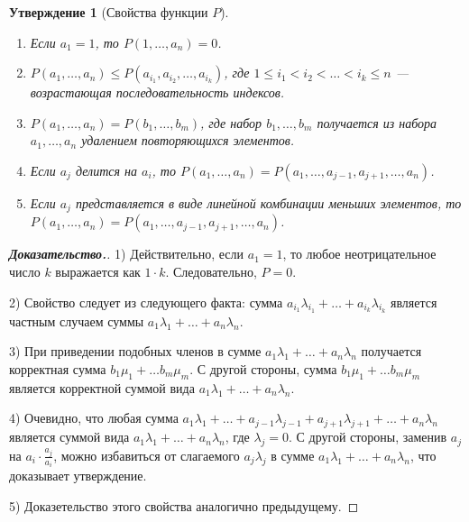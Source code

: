 \documentclass[12pt]{article}
\newtheorem{proposition}[theorem]{Утверждение}
\begin{document}
\begin{proposition}[Свойства функции $P$]{\ }
\label{propertiesOfP}
\begin{enumerate}
    \item Если $a_1 = 1$, то $P(1, \dots, a_n) = 0$.
    \item $P(a_1, \dots, a_n) \le P(a_{i_1} , a_{i_2}, \dots, a_{i_k})$, где $1 \le i_1 < i_2 < \dots < i_k \le n$ --- возрастающая последовательность индексов.
    \item $P(a_1, \dots, a_n) = P(b_1, \dots, b_m)$, где набор $b_1, \dots, b_m$ получается из набора $a_1, \dots, a_n$ удалением повторяющихся элементов.
    \item Если $a_j$ делится на $a_i$, то $P(a_1, \dots, a_n) = P(a_1, \dots, a_{j - 1}, a_{j + 1}, \dots, a_n)$.
    
    \item Если $a_j$ представляется в виде линейной комбинации меньших элементов, то \\
     $P(a_1, \dots, a_n) = P(a_1, \dots, a_{j - 1}, a_{j + 1}, \dots, a_n)$.
\end{enumerate}
\end{proposition}
\begin{proof}[\textbf{Доказательство.}]
1) Действительно, если $a_1 = 1$, то любое неотрицательное число $k$ выражается как $1 \cdot k$. Следовательно, $P = 0$.

2) Свойство следует из следующего факта: сумма $a_{i_1} \lambda_{i_1} + \dots + a_{i_k}\lambda_{i_k}$ является частным случаем суммы $a_1 \lambda_1 + \dots + a_n \lambda_n$.

3) При приведении подобных членов в сумме $a_1 \lambda_1 + \dots + a_n \lambda_n$ получается корректная сумма $b_1 \mu_1 + \dots b_m \mu_m$. С другой стороны, сумма $b_1 \mu_1 + \dots b_m \mu_m$ является корректной суммой вида $a_1 \lambda_1 + \dots + a_n \lambda_n$.

4) Очевидно, что любая сумма $a_1 \lambda_1 + \dots + a_{j - 1} \lambda_{j - 1} + a_{j + 1} \lambda_{j + 1} + \dots +a_n \lambda_n$ является суммой вида $a_1 \lambda_1 + \dots + a_n \lambda_n$, где $\lambda_j = 0$. С другой стороны, заменив $a_j$ на $a_i \cdot \frac{a_j}{a_i}$, можно избавиться от слагаемого $a_j \lambda_j$ в сумме $a_1 \lambda_1 + \dots + a_n \lambda_n$, что доказывает утверждение.

5) Доказетельство этого свойства аналогично предыдущему.
\end{proof}
\end{document}
